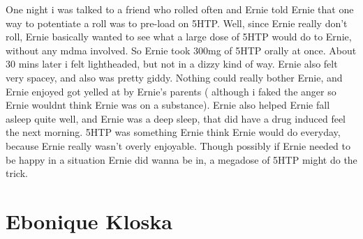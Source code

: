 \documentclass[12pt]{book}
\begin{document}
One night i was talked to a friend who rolled often and Ernie told Ernie that one way to potentiate a roll was to pre-load on 5HTP. Well, since Ernie really don't roll, Ernie basically wanted to see what a large dose of 5HTP would do to Ernie, without any mdma involved. So Ernie took 300mg of 5HTP orally at once. About 30 mins later i felt lightheaded, but not in a dizzy kind of way. Ernie also felt very spacey, and also was pretty giddy. Nothing could really bother Ernie, and Ernie enjoyed got yelled at by Ernie's parents ( although i faked the anger so Ernie wouldnt think Ernie was on a substance). Ernie also helped Ernie fall asleep quite well, and Ernie was a deep sleep, that did have a drug induced feel the next morning. 5HTP was something Ernie think Ernie would do everyday, because Ernie really wasn't overly enjoyable. Though possibly if Ernie needed to be happy in a situation Ernie did wanna be in, a megadose of 5HTP might do the trick.



\chapter{Ebonique Kloska}
\end{document}
